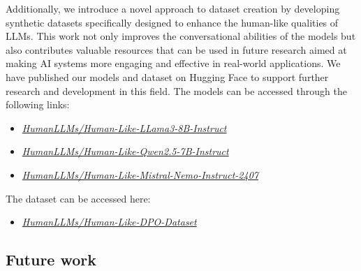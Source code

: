 \documentclass{article}
\begin{document}
Additionally, we introduce a novel approach to dataset creation by developing synthetic datasets specifically designed to enhance the human-like qualities of LLMs. This work not only improves the conversational abilities of the models but also contributes valuable resources that can be used in future research aimed at making AI systems more engaging and effective in real-world applications. 
\clearpage
We have published our models and dataset on Hugging Face \cite{huggingface} to support further research and development in this field. The models can be accessed through the following links:
\vspace{-0.2cm}
\begin{itemize}
    \item \textcolor{blue}{\href{https://huggingface.co/HumanLLMs/Human-Like-LLama3-8B-Instruct}{\textit{HumanLLMs/Human-Like-LLama3-8B-Instruct}}}
    \item \textcolor{blue}{\href{https://huggingface.co/HumanLLMs/Human-Like-Qwen2.5-7B-Instruct}{\textit{HumanLLMs/Human-Like-Qwen2.5-7B-Instruct}}}
    \item \textcolor{blue}{\href{https://huggingface.co/HumanLLMs/Human-Like-Mistral-Nemo-Instruct-2407}{\textit{HumanLLMs/Human-Like-Mistral-Nemo-Instruct-2407}}}
\end{itemize}
\vspace{-0.2cm}
The dataset can be accessed here:
\vspace{-0.2cm}
\begin{itemize}
    \item \textcolor{blue}{\href{https://huggingface.co/datasets/HumanLLMs/Human-Like-DPO-Dataset}{\textit{HumanLLMs/Human-Like-DPO-Dataset}}}
\end{itemize}
\vspace{-0.2cm}
\subsection{Future work}
\label{sec:future_work}
\end{document}
